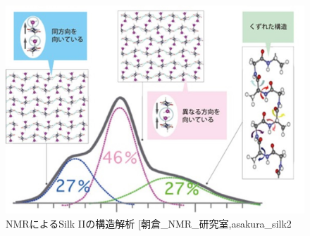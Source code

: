\documentclass[dvipdfmx,12pt,a4paper]{jreport}
\makeatletter
\DeclareRobustCommand\cite{\unskip
    	\@ifnextchar[{\@tempswatrue\@citex}{\@tempswafalse\@citex[]}}
\makeatother
\begin{document}
		\begin{figure}[H]
			\centering
			\includegraphics[scale=0.3]{NMR_silk_II.jpg}
			\caption{NMRによるSilk IIの構造解析\cite{朝倉_NMR_研究室,asakura_silk2}}
		\end{figure}

		
		
		\newpage
\end{document}

